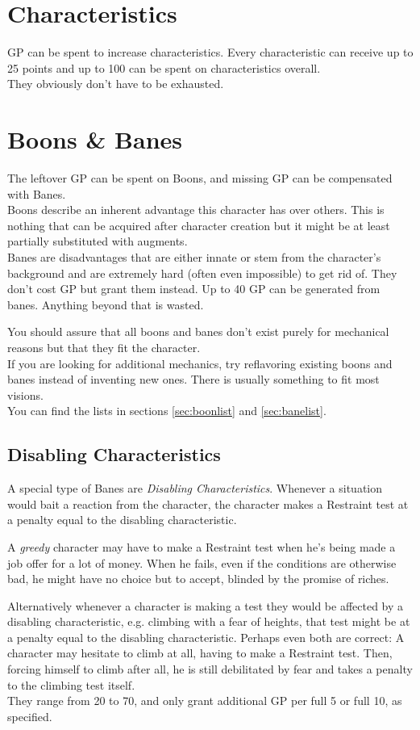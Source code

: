 \documentclass[11pt,a4paper,openany,dvipsnames]{book}
\begin{document}
	\section{Characteristics}
	GP can be spent to increase characteristics. Every characteristic can receive up to 25 points and up to 100 can be spent on characteristics overall.\\
	They obviously don’t have to be exhausted.
	\section{Boons \& Banes}
	The leftover GP can be spent on Boons, and missing GP can be compensated with Banes.\\
	Boons describe an inherent advantage this character has over others. This is nothing that can be acquired after character creation but it might be at least partially substituted with augments.\\
	Banes are disadvantages that are either innate or stem from the character’s background and are extremely hard (often even impossible) to get rid of.
	They don’t cost GP but grant them instead.
	Up to 40 GP can be generated from banes.
	Anything beyond that is wasted.
	\par
	You should assure that all boons and banes don’t exist purely for mechanical reasons but that they fit the character.\\
	If you are looking for additional mechanics, try reflavoring existing boons and banes instead of inventing new ones. There is usually something to fit most visions.\\
	You can find the lists in sections \ref{sec:boonlist} and \ref{sec:banelist}.

	\subsection{Disabling Characteristics}
	A special type of Banes are \emph{Disabling Characteristics}.
	Whenever a situation would bait a reaction from the character,
		the character makes a Restraint test at a penalty equal to the disabling characteristic.
		\begin{exampleblock}
			A \emph{greedy} character may have to make a Restraint test
				when he's being made a job offer for a lot of money.
			When he fails, even if the conditions are otherwise bad,
				he might have no choice but to accept,
				blinded by the promise of riches.
		\end{exampleblock}
	Alternatively whenever a character is making a test they would be affected by a disabling characteristic,
	e.g. climbing with a fear of heights, that test might be at a penalty equal to the disabling characteristic.
	Perhaps even both are correct:
	A character may hesitate to climb at all, having to make a Restraint test.
	Then, forcing himself to climb after all,
		he is still debilitated by fear and takes a penalty to the climbing test itself.
	\\%
	They range from 20 to 70, and only grant additional GP per full 5 or full 10, as specified.
\end{document}

